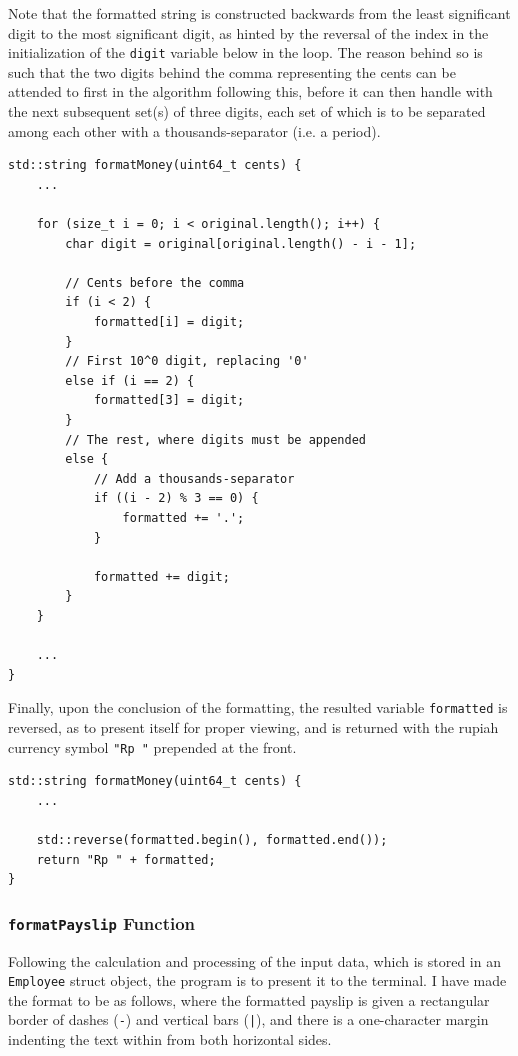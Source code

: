 \documentclass[12pt]{article}
\begin{document}
Note that the formatted string is constructed backwards from the least significant digit to the most significant digit, as hinted by the reversal of the index in the initialization of the \texttt{digit} variable below in the loop. The reason behind so is such that the two digits behind the comma representing the cents can be attended to first in the algorithm following this, before it can then handle with the next subsequent set(s) of three digits, each set of which is to be separated among each other with a thousands-separator (i.e. a period).

\begin{verbatim}
std::string formatMoney(uint64_t cents) {
    ...

    for (size_t i = 0; i < original.length(); i++) {
        char digit = original[original.length() - i - 1];

        // Cents before the comma
        if (i < 2) {
            formatted[i] = digit;
        }
        // First 10^0 digit, replacing '0'
        else if (i == 2) {
            formatted[3] = digit;
        }
        // The rest, where digits must be appended
        else {
            // Add a thousands-separator
            if ((i - 2) % 3 == 0) {
                formatted += '.';
            }

            formatted += digit;
        }
    }

    ...
}
\end{verbatim}

Finally, upon the conclusion of the formatting, the resulted variable \linebreak \texttt{formatted} is reversed, as to present itself for proper viewing, and is returned with the rupiah currency symbol \texttt{"Rp "} prepended at the front.

\begin{verbatim}
std::string formatMoney(uint64_t cents) {
    ...

    std::reverse(formatted.begin(), formatted.end());
    return "Rp " + formatted;
}
\end{verbatim}

\subsubsection{\texttt{formatPayslip} Function}

Following the calculation and processing of the input data, which is stored in an \texttt{Employee} struct object, the program is to present it to the terminal. I have made the format to be as follows, where the formatted payslip is given a rectangular border of dashes (\texttt{-}) and vertical bars (\texttt{|}), and there is a one-character margin indenting the text within from both horizontal sides.
\end{document}
